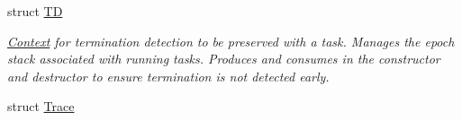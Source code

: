 \begin{DoxyCompactItemize}
struct \hyperlink{structvt_1_1ctx_1_1_t_d}{TD}
\begin{DoxyCompactList}\small\item\em \hyperlink{structvt_1_1ctx_1_1_context}{Context} for termination detection to be preserved with a task. Manages the epoch stack associated with running tasks. Produces and consumes in the constructor and destructor to ensure termination is not detected early. \end{DoxyCompactList}\item 
struct \hyperlink{structvt_1_1ctx_1_1_trace}{Trace}
\end{DoxyCompactItemize}
